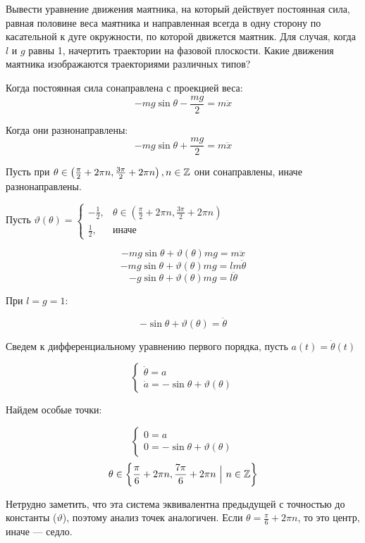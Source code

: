 Вывести уравнение движения маятника, на который действует постоянная сила, равная половине веса маятника и направленная всегда в одну сторону по касательной к дуге окружности, по которой движется маятник. Для случая, когда $l$ и $g$ равны 1, начертить траектории на фазовой плоскости. Какие движения маятника изображаются траекториями различных типов?

Когда постоянная сила сонаправлена с проекцией веса:
\[ - mg \sin \theta - \frac{mg}{2} = m\ddot x\]

Когда они разнонаправлены:
\[ - mg \sin \theta + \frac{mg}{2} = m\ddot x\]

Пусть при \(\theta \in \left( \frac{\pi}{2} + 2\pi n, \frac{3\pi}{2} + 2\pi n \right), n\in\mathbb{Z}\) они сонаправлены, иначе разнонаправлены.

Пусть \(\vartheta(\theta) = \begin{cases}
    - \frac{1}{2}, & \theta \in \left( \frac{\pi}{2} + 2\pi n, \frac{3\pi}{2} + 2\pi n \right) \\
    \frac{1}{2},   & \text{иначе}
\end{cases}\)

\[ - mg \sin \theta + \vartheta(\theta) mg = m\ddot x\]
\[ - mg \sin \theta + \vartheta(\theta) mg = lm\ddot \theta\]
\[ - g \sin \theta + \vartheta(\theta) mg = l\ddot \theta\]

При \(l = g = 1\):

\[ -\sin \theta + \vartheta(\theta) = \ddot \theta\]

Сведем к дифференциальному уравнению первого порядка, пусть \(a(t) = \dot \theta(t)\)

\[\begin{cases}
        \dot \theta = a \\
        \dot a = - \sin \theta + \vartheta(\theta)
    \end{cases}\]

Найдем особые точки:

\[\begin{cases}
        0 = a \\
        0 = - \sin \theta + \vartheta(\theta)
    \end{cases}\]
\[\theta \in \left\{ \frac{\pi}{6} + 2\pi n, \frac{7\pi}{6} + 2\pi n\ \Big|\ n\in\mathbb{Z}\right\}\]

Нетрудно заметить, что эта система эквивалентна предыдущей с точностью до константы (\(\vartheta\)), поэтому анализ точек аналогичен. Если \(\theta =\frac{\pi}{6} + 2\pi n\), то это центр, иначе --- седло.

